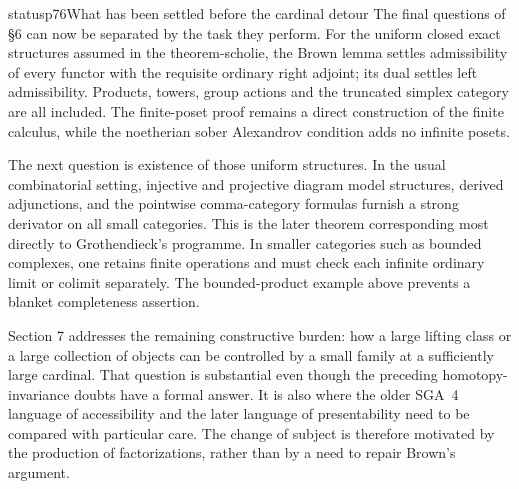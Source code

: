 \begin{dcomment}{status}{p76}{What has been settled before the cardinal detour}
The final questions of \S6 can now be separated by the task they perform. For the uniform closed exact structures assumed in the theorem-scholie, the Brown lemma settles admissibility of every functor with the requisite ordinary right adjoint; its dual settles left admissibility. Products, towers, group actions and the truncated simplex category are all included. The finite-poset proof remains a direct construction of the finite calculus, while the noetherian sober Alexandrov condition adds no infinite posets.

The next question is existence of those uniform structures. In the usual combinatorial setting, injective and projective diagram model structures, derived adjunctions, and the pointwise comma-category formulas furnish a strong derivator on all small categories. This is the later theorem corresponding most directly to Grothendieck's programme. In smaller categories such as bounded complexes, one retains finite operations and must check each infinite ordinary limit or colimit separately. The bounded-product example above prevents a blanket completeness assertion.

Section 7 addresses the remaining constructive burden: how a large lifting class or a large collection of objects can be controlled by a small family at a sufficiently large cardinal. That question is substantial even though the preceding homotopy-invariance doubts have a formal answer. It is also where the older SGA~4 language of accessibility and the later language of presentability need to be compared with particular care. The change of subject is therefore motivated by the production of factorizations, rather than by a need to repair Brown's argument.
\end{dcomment}

